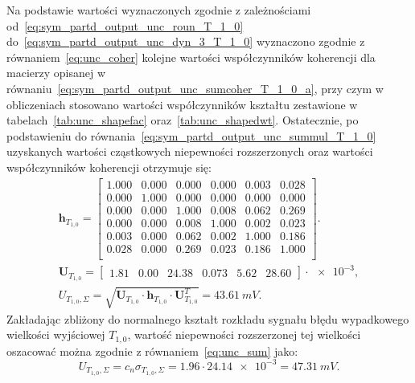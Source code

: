 Na podstawie wartości wyznaczonych zgodnie z zależnościami od~\eqref{eq:sym_partd_output_unc_roun_T_1_0} do~\eqref{eq:sym_partd_output_unc_dyn_3_T_1_0} wyznaczono zgodnie z równaniem~\eqref{eq:unc_coher} kolejne wartości współczynników koherencji dla macierzy opisanej w równaniu~\eqref{eq:sym_partd_output_unc_sumcoher_T_1_0_a}, przy czym w obliczeniach stosowano wartości współczynników kształtu zestawione w tabelach~\ref{tab:unc_shapefac} oraz~\ref{tab:unc_shapedwt}. Ostatecznie, po podstawieniu do równania~\eqref{eq:sym_partd_output_unc_summul_T_1_0} uzyskanych wartości cząstkowych niepewności rozszerzonych oraz wartości współczynników koherencji otrzymuje się:
\begin{gather}
\mathbf{h}_{T_{1,0}} =
\begin{bmatrix}
\num{1.000} & \num{0.000} & \num{0.000} & \num{0.000} & \num{0.003} & \num{0.028} \\
\num{0.000} & \num{1.000} & \num{0.000} & \num{0.000} & \num{0.000} & \num{0.000} \\
\num{0.000} & \num{0.000} & \num{1.000} & \num{0.008} & \num{0.062} & \num{0.269} \\
\num{0.000} & \num{0.000} & \num{0.008} & \num{1.000} & \num{0.002} & \num{0.023} \\
\num{0.003} & \num{0.000} & \num{0.062} & \num{0.002} & \num{1.000} & \num{0.186} \\
\num{0.028} & \num{0.000} & \num{0.269} & \num{0.023} & \num{0.186} & \num{1.000} \\
\end{bmatrix}
\label{eq:sym_partd_output_unc_sumcoherval_T_1_0_a}. \\
\mathbf{U}_{T_{1,0}} =
\begin{bmatrix}
\num{1.81} & \num{0.00} & \num{24.38} & \num{0.073} & \num{5.62} & \num{28.60}
\end{bmatrix} \cdot \num{e-3}
\label{eq:sym_partd_output_unc_sumuvectval_T_1_0}, \\
U_{T_{1,0},\Sigma} = \sqrt{\mathbf{U}_{T_{1,0}} \cdot \mathbf{h}_{T_{1,0}} \cdot \mathbf{U}_{T_{1,0}}^{T}} = \qty{43.61}{mV} \label{eq:sym_partd_output_unc_total_b_T_1_0}.
\end{gather}
Zakładając zbliżony do normalnego kształt rozkładu sygnału błędu wypadkowego wielkości wyjściowej $T_{1,0}$, wartość niepewności rozszerzonej tej wielkości oszacować można zgodnie z równaniem~\eqref{eq:unc_sum} jako:
\begin{equation}
U_{T_{1,0},\Sigma} = c_{n} \sigma_{T_{1,0},\Sigma} = \num{1.96} \cdot \num{24.14e-3} = \qty{47.31}{mV} \label{eq:sym_partd_output_unc_total_a_T_1_0}.
\end{equation}
